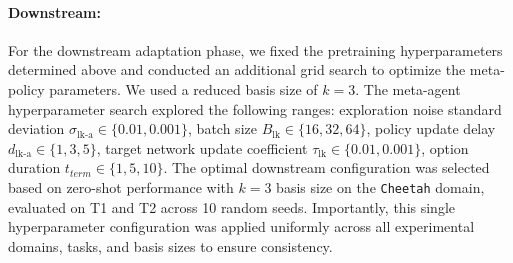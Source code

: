 \documentclass{article}
\theoremstyle{plain}
\theoremstyle{definition}
\theoremstyle{remark}
\begin{document}
\paragraph{Downstream:} 
For the downstream adaptation phase, we fixed the pretraining hyperparameters determined above and conducted an additional grid search to optimize the meta-policy parameters. We used a reduced basis size of $k=3$. The meta-agent hyperparameter search explored the following ranges: exploration noise standard deviation $\sigma_{\text{lk-a}} \in \{0.01, 0.001\}$, batch size $B_{\text{lk}} \in \{16, 32, 64\}$, policy update delay $d_{\text{lk-a}} \in \{1, 3, 5\}$, target network update coefficient $\tau_{\text{lk}} \in \{0.01, 0.001\}$, option duration $t_{term} \in \{1, 5, 10\}$. The optimal downstream configuration was selected based on zero-shot performance with $k=3$ basis size on the \texttt{Cheetah} domain, evaluated on T1 and T2 across 10 random seeds. Importantly, this single hyperparameter configuration was applied uniformly across all experimental domains, tasks, and basis sizes to ensure consistency. 
\end{document}
